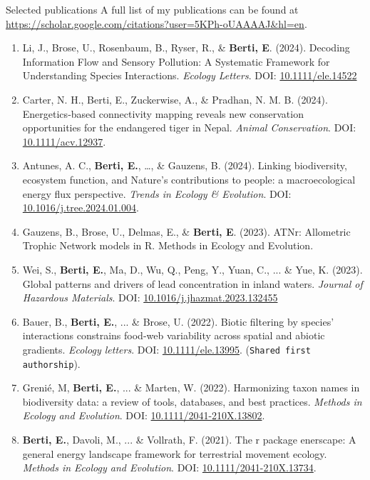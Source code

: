 \documentclass{resume} %
\begin{document}
\begin{rSection}{Selected publications}
A full list of my publications can be found at \url{https://scholar.google.com/citations?user=5KPh-oUAAAAJ&hl=en}.

\begin{enumerate}
    \setlength\itemsep{-0.5em}
    \item Li, J., Brose, U., Rosenbaum, B., Ryser, R., \& \textbf{Berti, E}. (2024). Decoding Information Flow and Sensory Pollution: A Systematic Framework for Understanding Species Interactions. \textit{Ecology Letters}. DOI: \href{https://doi.org/10.1111/ele.14522}{10.1111/ele.14522}
    \item Carter, N. H., Berti, E., Zuckerwise, A., \& Pradhan, N. M. B. (2024). Energetics‐based connectivity mapping reveals new conservation opportunities for the endangered tiger in Nepal. \textit{Animal Conservation}. DOI: \href{https://doi.org/10.1111/acv.12937}{10.1111/acv.12937}.
    \item Antunes, A. C., \textbf{Berti, E.}, \dots, \& Gauzens, B. (2024). Linking biodiversity, ecosystem function, and Nature’s contributions to people: a macroecological energy flux perspective. \textit{Trends in Ecology \& Evolution}. DOI: \href{https://doi.org/10.1016/j.tree.2024.01.004}{10.1016/j.tree.2024.01.004}.
    \item Gauzens, B., Brose, U., Delmas, E., \& \textbf{Berti, E}. (2023). ATNr: Allometric Trophic Network models in R. Methods in Ecology and Evolution.
    \item Wei, S., \textbf{Berti, E.}, Ma, D., Wu, Q., Peng, Y., Yuan, C., ... \& Yue, K. (2023). Global patterns and drivers of lead concentration in inland waters. \textit{Journal of Hazardous Materials}. DOI: \href{https://doi.org/10.1016/j.jhazmat.2023.132455}{10.1016/j.jhazmat.2023.132455}
    \item Bauer, B., \textbf{Berti, E.}, ... \& Brose, U. (2022). Biotic filtering by species’ interactions constrains food-web variability across spatial and abiotic gradients. \textit{Ecology letters}. DOI: \href{https://doi.org/10.1111/ele.13995}{10.1111/ele.13995}. (\texttt{Shared first authorship}).
    \item Grenié, M, \textbf{Berti, E.}, ... \& Marten, W. (2022). Harmonizing taxon names in biodiversity data: a review of tools, databases, and best practices. \textit{Methods in Ecology and Evolution}. DOI: \href{https://doi.org/10.1111/2041-210X.13802}{10.1111/2041-210X.13802}.
    \item \textbf{Berti, E.}, Davoli, M., ... \& Vollrath, F. (2021). The r package enerscape: A general energy landscape framework for terrestrial movement ecology. \textit{Methods in Ecology and Evolution}. DOI: \href{https://doi.org/10.1111/2041-210X.13734}{10.1111/2041-210X.13734}.

\end{enumerate}
\end{rSection}
\end{document}
